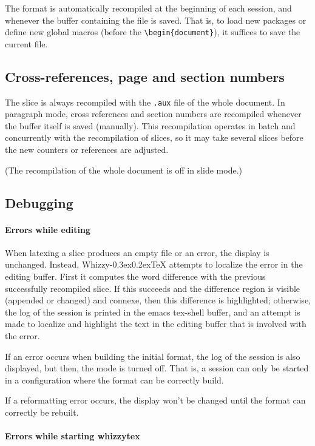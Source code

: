 \documentclass{article}
\let \lst \verb
\def \whizzy{{Whizzy\kern -0.3ex\raise 0.2ex\hbox{\TeX}}}
\begin{document}
The format is automatically recompiled at the beginning of each session, and
whenever the buffer containing the file is saved. That is, to load new
packages or define new global macros (before the \lst"\begin{document}"), it
suffices to save the current file.

\subsection {Cross-references, page and section numbers} 

The slice is always recompiled with the \lst".aux" file of the whole
document.  In paragraph mode, cross references and section numbers are 
recompiled whenever the buffer itself is saved (manually). 
This recompilation operates in batch and concurrently with the recompilation
of slices, so it may take several slices before the new counters or
references are adjusted.

(The recompilation of the whole document is off in slide mode.) 


\subsection {Debugging} 

\paragraph {Errors while editing}

When  latexing a slice produces an empty file or an error, the display is
unchanged. Instead, {\whizzy} attempts to localize the error in the editing
buffer. First it computes the word difference with the previous successfully
recompiled slice. If this succeeds and the difference region is visible
(appended or changed) and connexe, then this difference  is highlighted;
otherwise, the log of the session is printed in the emacs tex-shell buffer, 
and an attempt is made to localize and highlight the text in the editing
buffer that is involved with the error.


If an error occurs when building the initial format, the log of the session
is also displayed, but then, the mode is turned off. That is, a session can
only be started in a configuration where the format can be correctly build. 

If a reformatting error occurs, the display won't be changed until the format
can correctly be rebuilt.

\paragraph {Errors while starting whizzytex}


\end{document}
\end{document}
